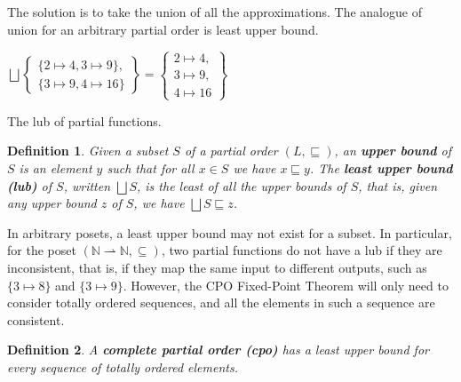 \documentclass{tufte-handout}
\newcommand{\pto}[0]{\rightharpoonup}
\newtheorem{definition}{Definition}%
\begin{document}
The solution is to take the union of all the approximations. The
analogue of union for an arbitrary partial order is least upper bound.

\begin{marginfigure}
$\bigsqcup \left\{\!\! \begin{array}{l}
              \{ 2 \mapsto 4, 3 \mapsto 9 \}, \\
              \{ 3 \mapsto 9, 4 \mapsto 16 \} 
                 \end{array}\!\! \right\}
= \left\{\!\! \begin{array}{l}
        2 \mapsto 4, \\ 3 \mapsto 9, \\ 4 \mapsto 16 
    \end{array}\!\! \right\}$
\caption{The lub of partial functions.}
\end{marginfigure}

\begin{definition}
Given a subset $S$ of a partial order $(L,\sqsubseteq)$, an
\textbf{\emph{upper bound}} of $S$ is an element $y$ such that for all
$x \in S$ we have $x \sqsubseteq y$.  The \textbf{\emph{least upper
    bound (lub)}} of $S$, written $\bigsqcup S$, is the least of all
the upper bounds of $S$, that is, given any upper bound $z$ of $S$, we
have $\bigsqcup S \sqsubseteq z$.
\end{definition}

In arbitrary posets, a least upper bound may not exist for a
subset. In particular, for the poset $(\mathbb{N}{\pto}\mathbb{N},
\subseteq)$, two partial functions do not have a lub if they are
inconsistent, that is, if they map the same input to different
outputs, such as $\{3\mapsto 8\}$ and $\{3 \mapsto 9\}$. However, the
CPO Fixed-Point Theorem will only need to consider totally ordered
sequences, and all the elements in such a sequence are consistent.

\begin{definition}
  A \textbf{\emph{complete partial order (cpo)}} has a least upper
  bound for every sequence of totally ordered elements.
\end{definition}


\end{document}
